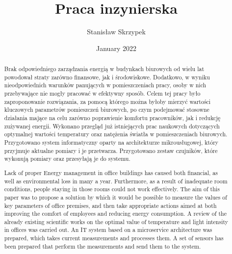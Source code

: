 \documentclass[11pt]{article} %
\title{Praca inzynierska}
\author{Stanisław Skrzypek}
\date{January 2022}
\begin{document}
\maketitle

\begin{abstract}
    Brak odpowiedniego zarządzania energią w budynkach biurowych od wielu lat 
    powodował straty zarówno finansowe, jak i środowiskowe. Dodatkowo, w wyniku 
    nieodpowiednich warunków panujących w pomieszczeniach pracy, osoby w nich 
    przebywające nie mogły pracować w efektywny sposób. Celem tej pracy było 
    zaproponowanie rozwiązania, za pomocą którego można byłoby mierzyć wartości 
    kluczowych parametrów pomieszczeń biurowych, po czym podejmować stosowne 
    działania mające na celu zarówno poprawienie komfortu pracowników, jak i 
    redukcję zużywanej energii. Wykonano przegląd już istniejących prac naukowych 
    dotyczących optymalnej wartości temperatury oraz natężenia światła w 
    pomieszczeniach biurowych. Przygotowano system informatyczny oparty na 
    architekturze mikrousługowej, który przyjmuje aktualne pomiary i je przetwarza. 
    Przygotowano zestaw czujników, które wykonują pomiary oraz przesyłają 
    je do systemu. 
\end{abstract}

\begin{otherlanguage}{english}
\begin{abstract}
    Lack of proper Energy management in office buildings has caused both 
    financial, as well as environmental loss in many a year. Furthermore, as 
    a result of inadequate room conditions, people staying in those rooms could 
    not work effectively. The aim of this paper was to propose a solution by which 
    it would be possible to measure the values of key parameters of office 
    premises, and then take appropriate actions aimed at both improving the comfort 
    of employees and reducing energy consumption. A review of the already existing 
    scientific works on the optimal value of temperature and light intensity in 
    offices was carried out. An IT system based on a microservice architecture was 
    prepared, which takes current measurements and processes them. A set of sensors 
    has been prepared that perform the measurements and send them to the system.
\end{abstract}
\end{otherlanguage}
\end{document}
